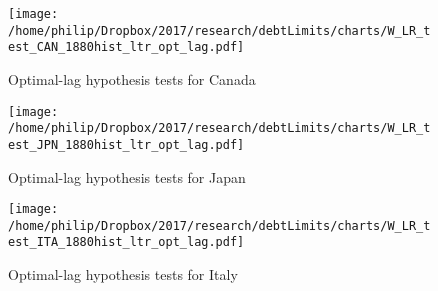 \documentclass{article}
\begin{document}
	\begin{figure}[htbp]
	    \centering
		\texttt{[image: /home/philip/Dropbox/2017/research/debtLimits/charts/W\_LR\_test\_CAN\_1880hist\_ltr\_opt\_lag.pdf]}
		\caption{Optimal-lag hypothesis tests for Canada}
	\end{figure}
	
		\begin{figure}[htbp]
	    \centering
		\texttt{[image: /home/philip/Dropbox/2017/research/debtLimits/charts/W\_LR\_test\_JPN\_1880hist\_ltr\_opt\_lag.pdf]}
		\caption{Optimal-lag hypothesis tests for Japan}
	\end{figure}
	
		\begin{figure}[htbp]
	    \centering
		\texttt{[image: /home/philip/Dropbox/2017/research/debtLimits/charts/W\_LR\_test\_ITA\_1880hist\_ltr\_opt\_lag.pdf]}
		\caption{Optimal-lag hypothesis tests for Italy}
	\end{figure}
\end{document}
